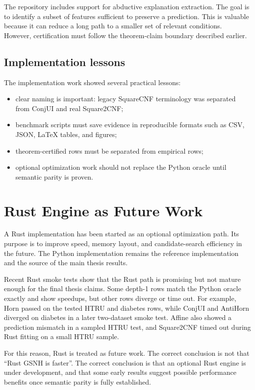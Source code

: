 \documentclass[11pt,a4paper]{article}
\begin{document}
The repository includes support for abductive explanation extraction. The goal is to identify a subset of features sufficient to preserve a prediction. This is valuable because it can reduce a long path to a smaller set of relevant conditions. However, certification must follow the theorem-claim boundary described earlier.

\subsection{Implementation lessons}

The implementation work showed several practical lessons:
\begin{itemize}
    \item clear naming is important: legacy SquareCNF terminology was separated from ConjUI and real Square2CNF;
    \item benchmark scripts must save evidence in reproducible formats such as CSV, JSON, LaTeX tables, and figures;
    \item theorem-certified rows must be separated from empirical rows;
    \item optional optimization work should not replace the Python oracle until semantic parity is proven.
\end{itemize}

\section{Rust Engine as Future Work}

A Rust implementation has been started as an optional optimization path. Its purpose is to improve speed, memory layout, and candidate-search efficiency in the future. The Python implementation remains the reference implementation and the source of the main thesis results.

Recent Rust smoke tests show that the Rust path is promising but not mature enough for the final thesis claims. Some depth-1 rows match the Python oracle exactly and show speedups, but other rows diverge or time out. For example, Horn passed on the tested HTRU and diabetes rows, while ConjUI and AntiHorn diverged on diabetes in a later two-dataset smoke test. Affine also showed a prediction mismatch in a sampled HTRU test, and Square2CNF timed out during Rust fitting on a small HTRU sample.

For this reason, Rust is treated as future work. The correct conclusion is not that ``Rust GSNH is faster''. The correct conclusion is that an optional Rust engine is under development, and that some early results suggest possible performance benefits once semantic parity is fully established.
\end{document}

